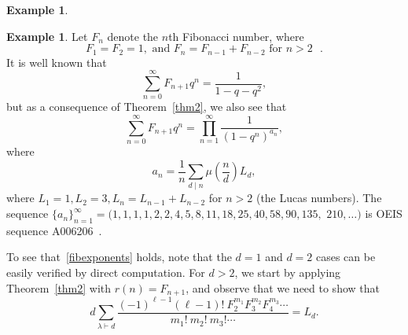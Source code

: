 \documentclass[10pt]{article}
\theoremstyle{definition}
\newtheorem{example}[theorem]{Example}
\numberwithin{theorem}{section}
\numberwithin{equation}{section}
\begin{document}
\begin{example}
\end{example}

\begin{example}
Let $F_n$ denote the $n$th Fibonacci number, where 
\[ F_1 = F_2 = 1, \mbox{  and } F_n = F_{n-1} + F_{n-2} \mbox{  for $n>2$ }.\]
It is well known that 
\[ \sum_{n=0}^\infty F_{n+1} q^n = \frac{1}{1-q-q^2}, \]
but as a consequence of Theorem~\ref{thm2}, we also see that
\[ \sum_{n=0}^\infty F_{n+1} q^n  = \prod_{n=1}^\infty \frac{1}{(1-q^n)^{a_n}}, \] where
\begin{equation} \label{fibexponents} 
a_n = \frac{1}{n} \sum_{d\mid n} \mu\left( \frac{n}{d} \right) L_{d}, 
\end{equation}
where $L_1 = 1,  L_2 = 3,  L_{n} = L_{n-1} + L_{n-2}$ for $n>2$ (the Lucas numbers).
The sequence $\{ a_n\}_{n=1}^\infty = 
(1, 1, 1, 1, 2, 2, 4, 5, 8, 11, 18, 25, 40, 58, 90, 135,$ $210, \dots)$ is 
OEIS sequence
A006206~\cite{oeisA006206}.  


To see that~\eqref{fibexponents} holds, note that the $d=1$ and $d=2$ cases can be
easily verified by direct computation.  For $d>2$, we start by applying Theorem~\ref{thm2} with
$r(n) = F_{n+1}$, and observe that we need to show that
\begin{equation} \label{Leq}
d \sum_{\lambda\vdash d} \frac{(-1)^{\ell -1} (\ell - 1)! \ F_2^{m_1} F_3^{m_2} F_4^{m_3} \cdots }
{m_1! \ m_2! \ m_3! \cdots } = L_d.
\end{equation}


\end{example}
\end{document}

